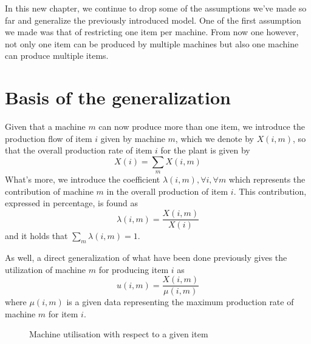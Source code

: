 In this new chapter, we continue to drop some of the assumptions we've made so far and generalize the previously introduced model. One of the first assumption we made was that of restricting one item per machine. From now one however, not only one item can be produced by multiple machines but also one machine can produce multiple items. 

\section{Basis of the generalization}

Given that a machine $m$ can now produce more than one item, we introduce the production flow of item $i$ given by machine $m$, which we denote by $X(i,m)$, so that the overall production rate of item $i$ for the plant is given by \[ X(i) = \sum_m X(i,m) \]
What's more, we introduce the coefficient $\lambda(i,m), \forall i, \forall m$ which represents the contribution of machine $m$ in the overall production of item $i$. This contribution, expressed in percentage, is found as \[ \lambda(i,m) = \frac{X(i,m)}{X(i)} \] and it holds that $\sum_m \lambda(i,m) = 1$. 

As well, a direct generalization of what have been done previously gives the utilization of machine $m$ for producing item $i$ as \[ u(i,m) = \frac{X(i,m)}{\mu(i,m)} \] where $\mu(i,m)$ is a given data representing the maximum production rate of machine $m$ for item $i$. 

\begin{figure}[h!]
    \centering
    \caption{\label{shared_res:util}Machine utilisation with respect to a given item}
\end{figure}

